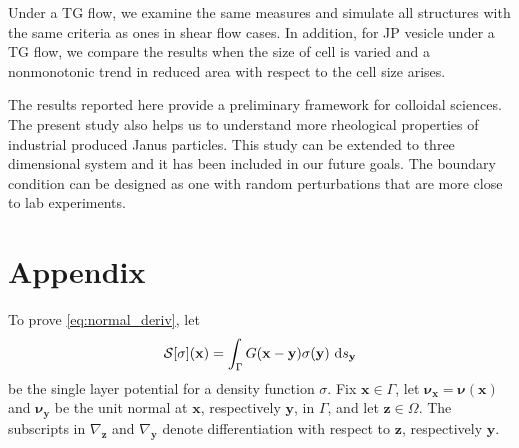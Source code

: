 \documentclass[prb,preprint,showpacs,preprintnumbers,amsmath,amssymb,longbibliography]{revtex4-1}
\newcommand{\nnu}{\boldsymbol{\nu}}
\newcommand{\xx}{\mathbf{x}}
\newcommand{\zz}{\mathbf{z}}
\newcommand{\yy}{\mathbf{y}}
\begin{document}
Under a TG flow, we examine the same measures and simulate all structures with 
the same criteria as ones in shear flow cases. In addition, for JP vesicle under a 
TG flow, we compare the results when the size of cell is varied and a nonmonotonic 
trend in reduced area with respect to the cell size arises.

The results reported here provide a preliminary framework for colloidal sciences. 
The present study also helps us to understand more rheological properties of industrial 
produced Janus particles. This study can be extended to three dimensional system 
and it has been included in our future goals. The boundary condition can be designed 
as one with random perturbations that are more close to lab experiments.





\section{Appendix}
\label{sec:appendix}
To prove \eqref{eq:normal_deriv}, let 
\begin{equation}
  \label{eq:SLP}
  \mathcal{S}[\sigma](\xx) = \int_\Gamma G(\xx-\yy) \sigma(\yy)\, \dif s_\yy
\end{equation}
be the single layer potential for a density function $\sigma.$
Fix $\xx \in \Gamma$,
let $\nnu_{\xx} = \nnu(\xx)$ and $\nnu_{\yy}$ be the unit normal at $\xx$, respectively $\yy$, in $\Gamma$,
and let $\zz \in \Omega$.  The subscripts in $\nabla_{\zz}$ and $\nabla_{\yy}$ denote
differentiation with respect to $\zz$, respectively $\yy$.
\end{document}
